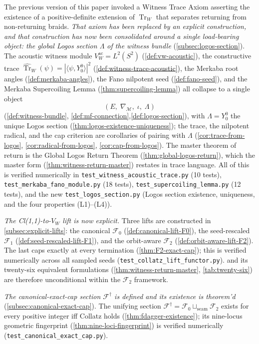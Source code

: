 \documentclass[11pt,a4paper]{article}
\theoremstyle{plain}
\theoremstyle{definition}
\theoremstyle{remark}
\numberwithin{equation}{section}
\DeclareMathOperator{\Tr}{Tr}
\begin{document}
The previous version of this paper invoked a Witness Trace Axiom
asserting the existence of a positive-definite extension of $\Tr_W$
that separates returning from non-returning braids.  \emph{That
axiom has been replaced by an explicit construction, and that
construction has now been consolidated around a single
load-bearing object: the global Logos section $\Lambda$ of the
witness bundle} (\cref{subsec:logos-section}).  The acoustic
witness module $V_W^{\mathrm{ac}}=L^2(S^2)$
(\cref{def:vw-acoustic}), the constructive trace
$\widehat{\Tr}_W(\psi)=|\langle\psi,Y_0^0\rangle|^2$
(\cref{def:witness-trace-acoustic}), the Merkaba root angles
(\cref{def:merkaba-angles}), the Fano nilpotent seed
(\cref{def:fano-seed}), and the Merkaba Supercoiling Lemma
(\cref{thm:supercoiling-lemma}) all collapse to a single object
\[
  (E,\;\nabla_{\mathcal{M}},\;\iota,\;\Lambda)
\]
(\cref{def:witness-bundle},
\cref{def:mf-connection},\cref{def:logos-section}), with
$\Lambda=Y_0^0$ the unique Logos section
(\cref{thm:logos-existence-uniqueness}); the trace, the nilpotent
radical, and the cap criterion are corollaries of pairing with
$\Lambda$ (\cref{cor:trace-from-logos},
\cref{cor:radical-from-logos}, \cref{cor:cap-from-logos}).  The
master theorem of return is the Global Logos Return Theorem
(\cref{thm:global-logos-return}), which the master form
(\cref{thm:witness-return-master}) restates in trace language.
All of this is verified numerically in
\texttt{test\_witness\_acoustic\_trace.py} (10 tests),
\texttt{test\_merkaba\_fano\_module.py} (18 tests),
\texttt{test\_supercoiling\_lemma.py} (12 tests), and the new
\texttt{test\_logos\_section.py} (Logos section existence,
uniqueness, and the four properties (L1)--(L4)).

\emph{The Cl(1,1)-to-$V_W$ lift is now explicit.}  Three lifts are
constructed in \cref{subsec:explicit-lifts}: the canonical
$\mathcal{F}_0$ (\cref{def:canonical-lift-F0}), the seed-rescaled
$\mathcal{F}_1$ (\cref{def:seed-rescaled-lift-F1}), and the
orbit-aware $\mathcal{F}_2$ (\cref{def:orbit-aware-lift-F2}).  The
last caps exactly at every termination
(\cref{thm:F2-exact-cap}); this is verified numerically across
all sampled seeds (\texttt{test\_collatz\_lift\_functor.py}).
 and its twenty-six equivalent
formulations (\cref{thm:witness-return-master},
\cref{tab:twenty-six}) are therefore unconditional within the
$\mathcal{F}_2$ framework.

\emph{The canonical-exact-cap section $\mathcal{F}^{\dagger}$ is
defined and its existence is theorem'd
} (\cref{subsec:canonical-exact-cap}).  The unifying section
$\mathcal{F}^{\dagger}=\mathcal{F}_0\sqcup_{\mathrm{seam}}
\mathcal{F}_2$ exists for every positive integer iff Collatz holds
(\cref{thm:fdagger-existence}); its nine-locus geometric
fingerprint (\cref{thm:nine-loci-fingerprint}) is verified
numerically (\texttt{test\_canonical\_exact\_cap.py}).
\end{document}
